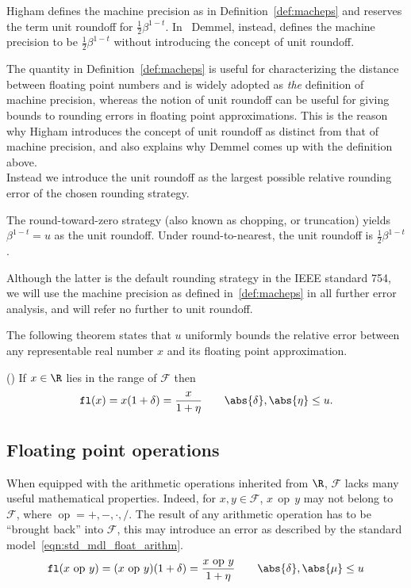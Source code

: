 Higham defines the machine precision as in Definition~\ref{def:macheps} and reserves the term unit roundoff for $\frac{1}{2}\beta^{1-t}$. In~\cite{demmel:book} Demmel, instead, defines the machine precision to be $\frac{1}{2}\beta^{1-t}$ without introducing the concept of unit roundoff.

The quantity in Definition~\ref{def:macheps} is useful for characterizing the distance between floating point numbers and is widely adopted as \emph{the} definition of machine precision, whereas the notion of unit roundoff can be useful for giving bounds to rounding errors in floating point approximations. This is the reason why Higham introduces the concept of unit roundoff as distinct from that of machine precision, and also explains why Demmel comes up with the definition above.\\	
Instead we introduce the unit roundoff as the largest possible relative rounding error of the chosen rounding strategy.
	
The round-toward-zero strategy (also known as chopping, or truncation) yields $\beta^{1-t}=u$ as the unit roundoff. Under round-to-nearest, the unit roundoff is $\frac{1}{2}\beta^{1-t}$.

Although the latter is the default rounding strategy in the \textsc{IEEE} standard 754, we will use the machine precision as defined in~\ref{def:macheps} in all further error analysis, and will refer no further to unit roundoff. 
\smallskip

The following theorem states that $u$ uniformly bounds the relative error between any representable real number $x$ and its floating point approximation.
\begin{teorema}{(\cite[Thm.~2.2]{higham:accuracy_book})}
	If $x\in\R$ lies in the range of $\mathcal{F}$ then 
	\[
		\mathtt{fl}(x)=x(1+\delta)=\frac{x}{1+\eta}\qquad\abs{\delta},\abs{\eta}\le u.
	\]
\end{teorema}

\subsection*{Floating point operations}
When equipped with the arithmetic operations inherited from $\R$, $\mathcal{F}$ lacks many useful mathematical properties. %
Indeed, for $x,y\in\mathcal{F}$, $x\,\operatorname{op}\,y$ may not belong to $\mathcal{F}$, where $\operatorname{op}=+,-,\cdot,/$. The result of any arithmetic operation has to be ``brought back'' into $\mathcal{F}$, this may introduce an error as described by the standard model~\eqref{eqn:std_mdl_float_arithm}.
\begin{equation}\label{eqn:std_mdl_float_arithm}
	\mathtt{fl}(x\,\operatorname{op}\,y) = (x\,\operatorname{op}\,y)(1+\delta)= \frac{x\,\operatorname{op}\,y}{1+\eta}\qquad\abs{\delta},\abs{\mu}\le u
\end{equation}

